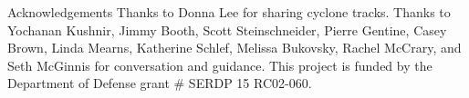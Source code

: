 \begin{block}{Acknowledgements}
    Thanks to Donna Lee for sharing cyclone tracks.
    Thanks to Yochanan Kushnir, Jimmy Booth, Scott Steinschneider, Pierre Gentine, Casey Brown, Linda Mearns, Katherine Schlef, Melissa Bukovsky, Rachel McCrary, and Seth McGinnis for conversation and guidance.
    This project is funded by the Department of Defense grant \# SERDP 15 RC02-060.
\end{block}
